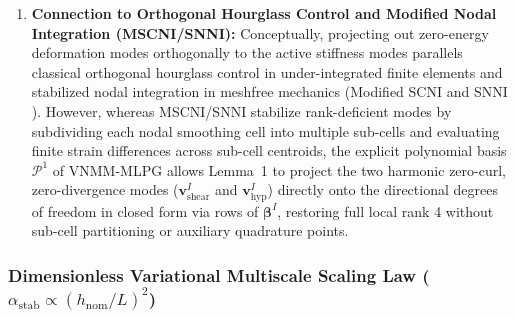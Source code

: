 \documentclass[VANCOUVER,Times1COL]{WileyNJD-v5}
\begin{document}
\begin{enumerate}
    \item \textbf{Connection to Orthogonal Hourglass Control and Modified Nodal Integration (MSCNI/SNNI):} Conceptually, projecting out zero-energy deformation modes orthogonally to the active stiffness modes parallels classical orthogonal hourglass control in under-integrated finite elements \cite{flanagan1981uniform} and stabilized nodal integration in meshfree mechanics (Modified SCNI and SNNI \cite{chen2001stabilized, chen2013arbitrary, hillman2018performance}). However, whereas MSCNI/SNNI stabilize rank-deficient modes by subdividing each nodal smoothing cell into multiple sub-cells and evaluating finite strain differences across sub-cell centroids, the explicit polynomial basis $\mathcal{P}^1$ of VNMM-MLPG allows Lemma~1 to project the two harmonic zero-curl, zero-divergence modes ($\mathbf{v}_{\mathrm{shear}}^I$ and $\mathbf{v}_{\mathrm{hyp}}^I$) directly onto the directional degrees of freedom in closed form via rows of $\boldsymbol{\beta}^I$, restoring full local rank 4 without sub-cell partitioning or auxiliary quadrature points.
\end{enumerate}

\subsubsection{Dimensionless Variational Multiscale Scaling Law (\texorpdfstring{$\alpha_{\mathrm{stab}} \propto (h_{\mathrm{nom}}/L)^2$}{alpha\_stab proportional to (h\_nom/L)2})}
\label{subsubsec:vms_scaling_law}
\end{document}
